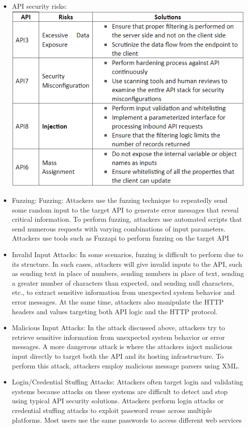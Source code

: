 \begin{itemize}
    \item API security risks:\\
    \includegraphics{exam_prep/API Security Risks.png}
    \item Fuzzing: Fuzzing: Attackers use the fuzzing technique to repeatedly send some random input to the target API to generate error messages that reveal critical information. To perform fuzzing, attackers use automated scripts that send numerous requests with varying combinations of input parameters. Attackers use tools such as Fuzzapi to perform fuzzing on the target API
    \item Invalid Input Attacks: In some scenarios, fuzzing is difficult to perform due to its structure. In such cases, attackers will give invalid inputs to the API, such as sending text in place of numbers, sending numbers in place of text, sending a greater number of characters than expected, and sending null characters, etc., to extract sensitive information from unexpected system behavior and error messages. At the same time, attackers also manipulate the HTTP headers and values targeting both API logic and the HTTP protocol.
    \item Malicious Input Attacks: In the attack discussed above, attackers try to retrieve sensitive information from unexpected system behavior or error messages. A more dangerous attack is where the attackers inject malicious input directly to target both the API and its hosting infrastructure. To perform this attack, attackers employ malicious message parsers using XML.
    \item Login/Credential Stuffing Attacks: Attackers often target login and validating systems because attacks on these systems are difficult to detect and stop using typical API security solutions. Attackers perform login attacks or credential stuffing attacks to exploit password reuse across multiple platforms. Most users use the same passwords to access different web services

\end{itemize}
